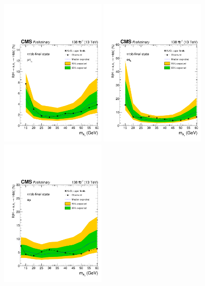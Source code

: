 \begin{figure}[h!]
    \begin{center}
        \includegraphics[width=0.45\textwidth]{figures/ch-13-results/Limit_mt_prelim.pdf}
        \includegraphics[width=0.45\textwidth]{figures/ch-13-results/Limit_et_prelim.pdf}\\
        \includegraphics[width=0.45\textwidth]{figures/ch-13-results/Limit_em_prelim.pdf}

\end{center}
\end{figure}
